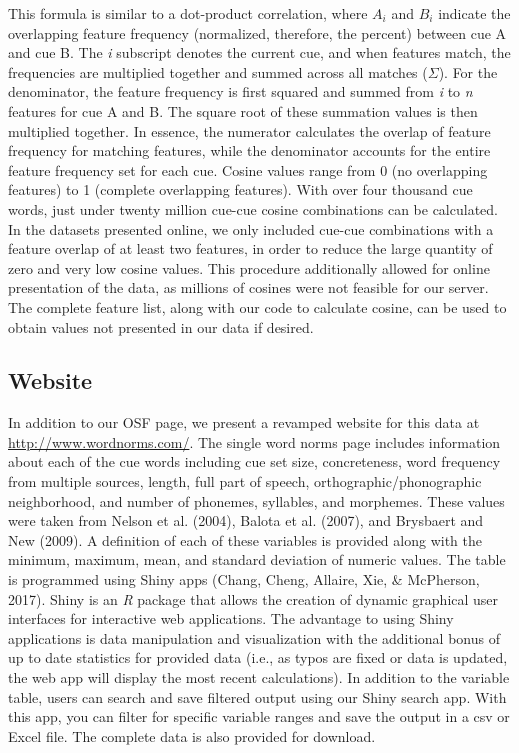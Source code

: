 \documentclass[english,,man]{apa6}
\begin{document}
This formula is similar to a dot-product correlation, where \(A_i\) and \(B_i\) indicate the overlapping feature frequency (normalized, therefore, the percent) between cue A and cue B. The \emph{i} subscript denotes the current cue, and when features match, the frequencies are multiplied together and summed across all matches (\(\Sigma\)). For the denominator, the feature frequency is first squared and summed from \emph{i} to \emph{n} features for cue A and B. The square root of these summation values is then multiplied together. In essence, the numerator calculates the overlap of feature frequency for matching features, while the denominator accounts for the entire feature frequency set for each cue. Cosine values range from 0 (no overlapping features) to 1 (complete overlapping features). With over four thousand cue words, just under twenty million cue-cue cosine combinations can be calculated. In the datasets presented online, we only included cue-cue combinations with a feature overlap of at least two features, in order to reduce the large quantity of zero and very low cosine values. This procedure additionally allowed for online presentation of the data, as millions of cosines were not feasible for our server. The complete feature list, along with our code to calculate cosine, can be used to obtain values not presented in our data if desired.

\hypertarget{website}{%
\subsection{Website}\label{website}}

In addition to our OSF page, we present a revamped website for this data at \url{http://www.wordnorms.com/}. The single word norms page includes information about each of the cue words including cue set size, concreteness, word frequency from multiple sources, length, full part of speech, orthographic/phonographic neighborhood, and number of phonemes, syllables, and morphemes. These values were taken from Nelson et al. (2004), Balota et al. (2007), and Brysbaert and New (2009). A definition of each of these variables is provided along with the minimum, maximum, mean, and standard deviation of numeric values. The table is programmed using Shiny apps (Chang, Cheng, Allaire, Xie, \& McPherson, 2017). Shiny is an \emph{R} package that allows the creation of dynamic graphical user interfaces for interactive web applications. The advantage to using Shiny applications is data manipulation and visualization with the additional bonus of up to date statistics for provided data (i.e., as typos are fixed or data is updated, the web app will display the most recent calculations). In addition to the variable table, users can search and save filtered output using our Shiny search app. With this app, you can filter for specific variable ranges and save the output in a csv or Excel file. The complete data is also provided for download.
\end{document}

